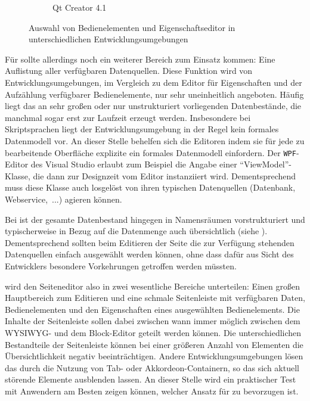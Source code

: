 \begin{figure}[h]
\begin{subfigure}[b]{0.45\textwidth}
    \caption{Qt Creator 4.1}
  \end{subfigure}
  \caption{Auswahl von Bedienelementen und Eigenschaftseditor in unterschiedlichen Entwicklungsumgebungen}
  \label{fig:sidebar-example}
\end{figure}

Für \idename{} sollte allerdings noch ein weiterer Bereich zum Einsatz kommen: Eine Auflistung aller verfügbaren Datenquellen. Diese Funktion wird von Entwicklungsumgebungen, im Vergleich zu dem Editor für Eigenschaften und der Aufzählung verfügbarer Bedienelemente, nur sehr uneinheitlich angeboten. Häufig liegt das an sehr großen oder nur unstrukturiert vorliegenden Datenbestände, die manchmal sogar erst zur Laufzeit erzeugt werden. Insbesondere bei Skriptsprachen liegt der Entwicklungsumgebung in der Regel kein formales Datenmodell vor. An dieser Stelle behelfen sich die Editoren indem sie für jede zu bearbeitende Oberfläche explizite ein formales Datenmodell einfordern. Der \texttt{WPF}-Editor des Visual Studio erlaubt zum Beispiel die Angabe einer "`ViewModel"'-Klasse, die dann zur Designzeit vom Editor instanziiert wird. Dementsprechend muss diese Klasse auch losgelöst von ihren typischen Datenquellen (Datenbank, Webservice,~...) agieren können.

Bei \idename{} ist der gesamte Datenbestand hingegen in Namensräumen vorstrukturiert und typischerweise in Bezug auf die Datenmenge auch übersichtlich (siehe ). Dementsprechend sollten beim Editieren der Seite die zur Verfügung stehenden Datenquellen einfach ausgewählt werden können, ohne dass dafür aus Sicht des Entwicklers besondere Vorkehrungen getroffen werden müssten.

\idename{} wird den Seiteneditor also in zwei wesentliche Bereiche unterteilen: Einen großen Hauptbereich zum Editieren und eine schmale Seitenleiste mit verfügbaren Daten, Bedienelementen und den Eigenschaften eines ausgewählten Bedienelements. Die Inhalte der Seitenleiste sollen dabei zwischen wann immer möglich zwischen dem WYSIWYG- und dem Block-Editor geteilt werden können. Die unterschiedlichen Bestandteile der Seitenleiste können bei einer größeren Anzahl von Elementen die Übersichtlichkeit negativ beeinträchtigen. Andere Entwicklungsumgebungen lösen das durch die Nutzung von Tab- oder Akkordeon-Containern, so das sich aktuell störende Elemente ausblenden lassen. An dieser Stelle wird ein praktischer Test mit Anwendern am Besten zeigen können, welcher Ansatz für \idename{} zu bevorzugen ist.

